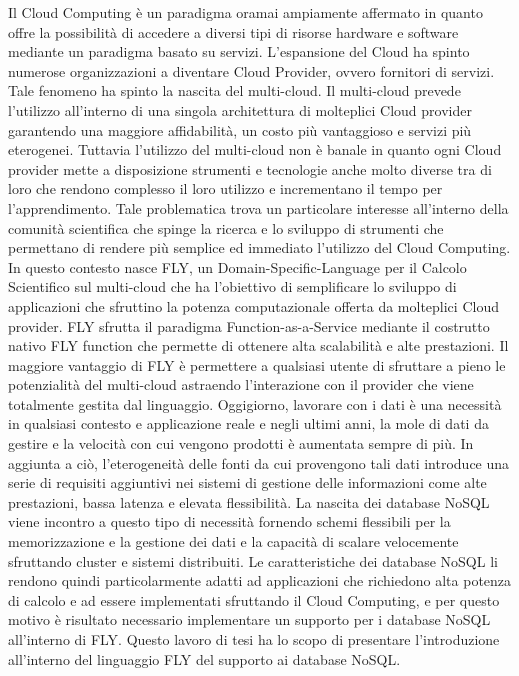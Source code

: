 Il Cloud Computing è un paradigma oramai ampiamente affermato in quanto offre la possibilità di accedere a diversi tipi di risorse hardware e software mediante un paradigma basato su servizi. L'espansione del Cloud ha spinto numerose organizzazioni a diventare Cloud Provider, ovvero fornitori di servizi. Tale fenomeno ha spinto la nascita del multi-cloud. Il multi-cloud prevede l'utilizzo all'interno di una singola architettura di molteplici Cloud provider garantendo una maggiore affidabilità, un costo più vantaggioso e servizi più eterogenei.
Tuttavia l'utilizzo del multi-cloud non è banale in quanto ogni Cloud provider mette a disposizione strumenti e tecnologie anche molto diverse tra di loro che rendono complesso il loro utilizzo e incrementano il tempo per l'apprendimento.
Tale problematica trova un particolare interesse all'interno della comunità scientifica che spinge la ricerca e lo sviluppo di strumenti che permettano di rendere più semplice ed immediato l'utilizzo del Cloud Computing. In questo contesto nasce FLY, un Domain-Specific-Language per il Calcolo Scientifico sul multi-cloud che ha l’obiettivo di semplificare lo sviluppo di applicazioni che sfruttino la potenza computazionale offerta da molteplici Cloud provider. FLY sfrutta il paradigma Function-as-a-Service mediante il costrutto nativo FLY function che permette di ottenere alta scalabilità e alte prestazioni. Il maggiore vantaggio di FLY è permettere a qualsiasi utente di sfruttare a pieno le potenzialità del multi-cloud astraendo l'interazione con il provider che viene totalmente gestita dal linguaggio.
Oggigiorno, lavorare con i dati è una necessità in qualsiasi contesto e applicazione reale e negli ultimi anni, la mole di dati da gestire e la velocità con cui vengono prodotti è aumentata sempre di più. In aggiunta a ciò, l'eterogeneità delle fonti da cui provengono tali dati introduce una serie di requisiti aggiuntivi nei sistemi di gestione delle informazioni come alte prestazioni, bassa latenza e elevata flessibilità. 
La nascita dei database NoSQL viene incontro a questo tipo di necessità fornendo schemi flessibili per la memorizzazione e la gestione dei dati e la capacità di scalare velocemente sfruttando cluster e sistemi distribuiti.  Le caratteristiche dei database NoSQL li rendono quindi particolarmente adatti ad applicazioni che richiedono alta potenza di calcolo e ad essere implementati sfruttando il Cloud Computing, e per questo motivo è risultato necessario implementare un supporto per i database NoSQL all’interno di FLY.
Questo lavoro di tesi ha lo scopo di presentare l'introduzione all'interno del linguaggio FLY del supporto ai database NoSQL.
